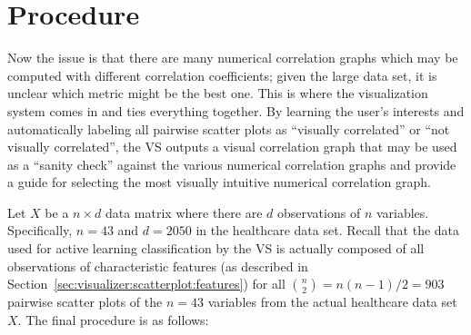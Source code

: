 \section{Procedure}
\label{sec:usage:newanalysis}

Now the issue is that there are many numerical correlation graphs which may be 
computed with different correlation coefficients; given the large data set, it 
is unclear which metric might be the best one. This is where the visualization 
system comes in and ties everything together. By learning the user's interests 
and automatically labeling all pairwise scatter plots as ``visually 
correlated'' or ``not visually correlated'', the 
VS outputs a visual correlation graph that may be used as a ``sanity check'' 
against the various numerical correlation graphs and provide a guide for 
selecting the most visually intuitive numerical correlation graph.

Let $X$ be a $n\times d$ data matrix where there are $d$ observations of $n$ 
variables. Specifically, $n = 43$ and $d = 2050$ in the healthcare data set. 
Recall that the data used for active learning classification by the 
VS is actually 
composed of all observations of characteristic features (as described in 
Section~\ref{sec:visualizer:scatterplot:features}) for all ${n\choose 2} = 
n(n-1)/2 = 903$ pairwise scatter plots of the $n=43$ variables from the actual 
healthcare data set $X$. The final procedure is as follows:

